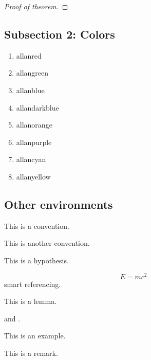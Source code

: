 \documentclass[12pt]{extarticle}
\begin{document}
\begin{proof}[Proof of theorem]
    \end{proof}

    \subsection{Subsection 2: Colors}
    \begin{enumerate}
        \item {\color{allanred}allanred}
        \item {\color{allangreen}allangreen}
        \item {\color{allanblue}allanblue}
        \item {\color{allandarkblue}allandarkblue}
        \item {\color{allanorange}allanorange}
        \item {\color{allanpurple}allanpurple}
        \item {\color{allancyan}allancyan}
        \item {\color{allanyellow}allanyellow}
    \end{enumerate}

    \subsection{Other environments}
    \begin{convention}[Convention]\label{convention}
        This is a convention.
    \end{convention}
    \begin{convention}\label{another convention}
        This is another convention.
    \end{convention}
    \begin{hypothesis}[Hypothesis]\label{hypothesis}
        This is a hypothesis.
    \end{hypothesis}
    \begin{equation}\label{eqn:big equation}
        E = mc^2
    \end{equation}
     smart referencing.
    \begin{lemma}\label{lemma}
        This is a lemma.
    \end{lemma}
     and .
    \begin{example}[Example]\label{example}
        This is an example.
    \end{example}
    \begin{remark}
        This is a remark.
    \end{remark}
\end{document}
